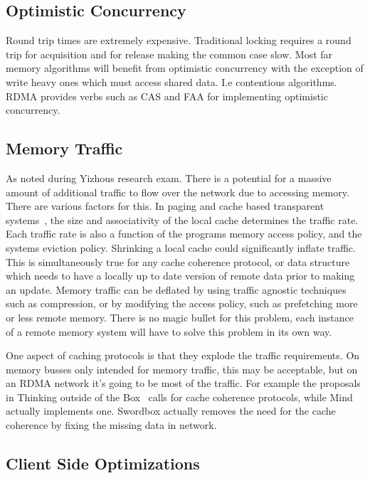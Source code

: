 \subsection{Optimistic Concurrency} Round trip times are extremely expensive.
Traditional locking requires a round trip for acquisition and for release making
the common case slow. Most far memory algorithms will benefit from optimistic
concurrency with the exception of write heavy ones which must access shared
data. I.e contentious algorithms. RDMA provides verbs such as CAS and FAA for
implementing optimistic concurrency.

\subsection{Memory Traffic} As noted during Yizhous research exam. There is a
potential for a massive amount of additional traffic to flow over the network
due to accessing memory. There are various factors for this. In paging and cache
based transparent systems~\cite{fastswap,kona,gms,infiniswap,legoos,lite}, the
size and associativity of the local cache determines the traffic rate. Each
traffic rate is also a function of the programs memory access policy, and the
systems eviction policy. Shrinking a local cache could significantly inflate
traffic. This is simultaneously true for any cache coherence protocol, or data
structure which needs to have a locally up to date version of remote data prior
to making an update. Memory traffic can be deflated by using traffic agnostic
techniques such as compression, or by modifying the access policy, such as
prefetching more or less remote memory. There is no magic bullet for this
problem, each instance of a remote memory system will have to solve this problem
in its own way.

One aspect of caching protocols is that they explode the traffic requirements.
On memory busses only intended for memory traffic, this may be acceptable, but
on an RDMA network it's going to be most of the traffic. For example the
proposals in Thinking outside of the Box~\cite{design-far-memory-struct} calls
for cache coherence protocols, while Mind~\cite{mind} actually implements one.
Swordbox actually removes the need for the cache coherence by fixing the missing
data in network.

\subsection{Client Side Optimizations}

